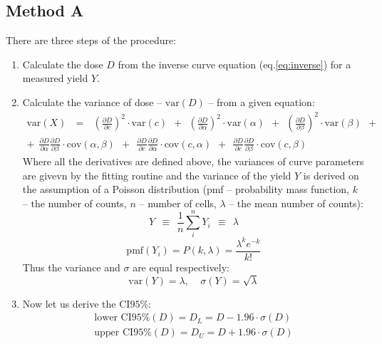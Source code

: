 \documentclass[a4paper,11pt]{article}
\begin{document}
\subsection{Method A}
There are three steps of the procedure:
\begin{enumerate}
\item Calculate the dose $D$ from the inverse curve equation (eq.\ref{eq:inverse}) for a measured yield $Y$.

\item Calculate the variance of dose -- $\textrm{var}(D)$ -- from a given equation:
\begin{equation} \label{eq:Dvar}
\begin{split}
\textrm{var}(X)~~~=~~~
\left( \frac{\partial D}{\partial c} \right)^2 \cdot \textrm{var}(c)~~+~~ 
\left( \frac{\partial D}{\partial \alpha} \right)^2 \cdot \textrm{var}(\alpha)~~+~~ 
\left( \frac{\partial D}{\partial \beta} \right)^2 \cdot \textrm{var}(\beta)~~+ \\
+~~\frac{\partial D}{\partial \alpha}\frac{\partial D}{\partial \beta} \cdot \textrm{cov}(\alpha,\beta)~~+~~ 
\frac{\partial D}{\partial c}\frac{\partial D}{\partial \alpha} \cdot \textrm{cov}(c,\alpha)~~+~~ 
\frac{\partial D}{\partial c}\frac{\partial D}{\partial \beta} \cdot \textrm{cov}(c,\beta)
\end{split}
\end{equation}
Where all the derivatives are defined above, the variances of curve parameters are givevn by the fitting routine and the variance of the yield $Y$ is derived on the assumption of a Poisson distribution (pmf -- probability mass function, $k$ -- the number of counts, $n$ -- number of cells, $\lambda$ -- the mean number of counts):
\begin{equation} \label{eq:Y}
Y~~\equiv~~\frac{1}{n} \sum^n_i Y_i~~\equiv~~\lambda 
\end{equation}
\begin{equation} \label{eq:Ydist}
\textrm{pmf}(Y_i) = P(k, \lambda) = \frac{\lambda^k e^{-k}}{k!}
\end{equation}
Thus the variance and $\sigma$ are equal respectively:
\begin{equation} \label{eq:Yvar}
\textrm{var}(Y) = \lambda,~~~~~\sigma(Y)=	\sqrt{\lambda}
\end{equation}

\item Now let us derive the CI$95\%$:
\begin{equation} \label{eq:DCI}
\begin{split}
\textrm{lower CI}95\%(D) = D_L = D - 1.96\cdot \sigma(D) \\
\textrm{upper CI}95\%(D) = D_U = D + 1.96\cdot \sigma(D)
\end{split}
\end{equation}
\end{enumerate}
\end{document}
